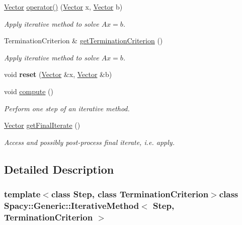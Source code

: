 \begin{DoxyCompactItemize}
\item 
\hyperlink{classSpacy_1_1Generic_1_1Vector}{Vector} \hyperlink{classSpacy_1_1Generic_1_1IterativeMethod_a87278a2b0ef67d35c3bd000415efec6a}{operator()} (\hyperlink{classSpacy_1_1Generic_1_1Vector}{Vector} x, \hyperlink{classSpacy_1_1Generic_1_1Vector}{Vector} b)
\begin{DoxyCompactList}\small\item\em Apply iterative method to solve $Ax=b$. \end{DoxyCompactList}\item 
Termination\-Criterion \& \hyperlink{classSpacy_1_1Generic_1_1IterativeMethod_a9e112dd05cb8a45a28dc601a2aff6105}{get\-Termination\-Criterion} ()
\begin{DoxyCompactList}\small\item\em Apply iterative method to solve $Ax=b$. \end{DoxyCompactList}\item 
\hypertarget{classSpacy_1_1Generic_1_1Step_a9369b492a0e8233de616a8a08415f92e}{void {\bfseries reset} (\hyperlink{classSpacy_1_1Generic_1_1Vector}{Vector} \&x, \hyperlink{classSpacy_1_1Generic_1_1Vector}{Vector} \&b)}\label{classSpacy_1_1Generic_1_1Step_a9369b492a0e8233de616a8a08415f92e}

\item 
void \hyperlink{classSpacy_1_1Generic_1_1Step_ac400c25a81a5138b4926bbb99692b343}{compute} ()
\begin{DoxyCompactList}\small\item\em Perform one step of an iterative method. \end{DoxyCompactList}\item 
\hyperlink{classSpacy_1_1Generic_1_1Vector}{Vector} \hyperlink{classSpacy_1_1Generic_1_1Step_a5be9a8afa47319b645b2df73b3b23acc}{get\-Final\-Iterate} ()
\begin{DoxyCompactList}\small\item\em Access and possibly post-\/process final iterate, i.\-e. apply. \end{DoxyCompactList}\end{DoxyCompactItemize}


\subsection{Detailed Description}
\subsubsection*{template$<$class Step, class Termination\-Criterion$>$class Spacy\-::\-Generic\-::\-Iterative\-Method$<$ Step, Termination\-Criterion $>$}

